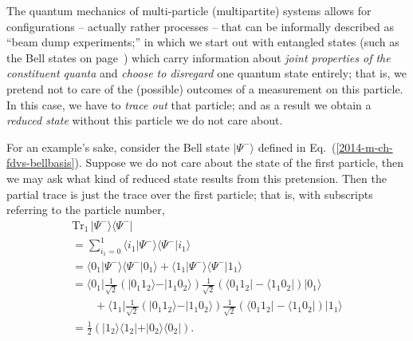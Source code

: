 The quantum mechanics of multi-particle (multipartite) systems allows for configurations -- actually rather processes --
that can be informally described as ``beam dump experiments;'' in which we start out with entangled states
(such as the Bell states on page~\pageref{2014-m-ch-fdvs-bellbasis})  which carry information
about {\em joint properties of the constituent quanta}
and {\em choose to disregard} one quantum state entirely; that is, we pretend
not to care of the (possible) outcomes of a measurement on this particle.
In this case, we have to {\em trace out} that particle; and as a result we obtain a {\em reduced state} without this particle we do
not care about.


{\color{blue}
\bexample
\label{bellstate}
For an example's sake, consider the Bell state         $\vert \Psi^- \rangle$
defined in Eq.~(\ref{2014-m-ch-fdvs-bellbasis}).
Suppose we do not care about the state of the first particle, then we may ask what kind of reduced state results from this
pretension.
Then the partial trace is just the trace over the first particle; that is, with subscripts referring to the particle number,
\begin{equation}
\begin{split}
\textrm{Tr}_1\, \vert \Psi^- \rangle \langle  \Psi^-   \vert  \\
=\sum_{i_1=0}^1 \langle i_1 \vert \Psi^- \rangle \langle  \Psi^-  \vert i_1 \rangle \\
=\langle 0_1 \vert \Psi^- \rangle \langle  \Psi^-  \vert 0_1 \rangle
+
\langle 1_1  \vert \Psi^- \rangle \langle  \Psi^-  \vert 1_1 \rangle  \\
=\langle 0_1 \vert  \frac{1}{\sqrt{2}}\left(\vert 0_1   1_2 \rangle - \vert 1_1   0_2 \rangle  \right)  \frac{1}{\sqrt{2}}\left(\langle 0_1   1_2 \vert  - \langle 1_1   0_2 \vert   \right)  \vert 0_1 \rangle\\
\qquad
+
\langle 1_1 \vert  \frac{1}{\sqrt{2}}\left(\vert 0_1   1_2 \rangle - \vert 1_1   0_2 \rangle  \right)  \frac{1}{\sqrt{2}}\left(\langle 0_1   1_2 \vert  - \langle 1_1   0_2 \vert   \right)  \vert 1_1 \rangle  \\
= \frac{1}{2}
\left(
\vert 1_2 \rangle \langle   1_2 \vert
+
\vert 0_2 \rangle \langle   0_2 \vert
\right)
.
\end{split}
\end{equation}

}
